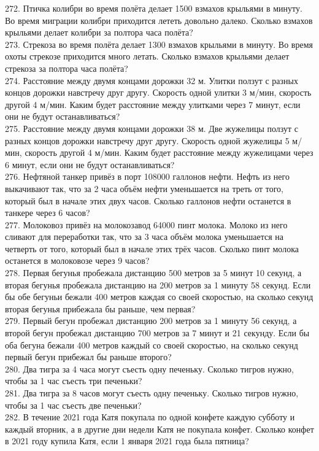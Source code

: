 272. Птичка колибри во время полёта делает 1500 взмахов крыльями в минуту. Во время миграции колибри приходится лететь довольно далеко. Сколько взмахов крыльями делает колибри за полтора часа полёта?\\
273. Стрекоза во время полёта делает 1300 взмахов крыльями в минуту. Во время охоты стрекозе приходится много летать. Сколько взмахов крыльями делает стрекоза за полтора часа полёта?\\
274. Расстояние между двумя концами дорожки 32 м. Улитки ползут с разных концов дорожки навстречу друг другу. Скорость одной улитки 3 м/мин, скорость другой 4 м/мин. Каким будет расстояние между улитками через 7 минут, если они не будут останавливаться?\\
275. Расстояние между двумя концами дорожки 38 м. Две жужелицы ползут с разных концов дорожки навстречу друг другу. Скорость одной жужелицы 5 м/мин, скорость другой 4 м/мин. Каким будет расстояние между жужелицами через 6 минут, если они не будут останавливаться?\\
276. Нефтяной танкер привёз в порт 108000 галлонов нефти. Нефть из него выкачивают так, что за 2 часа объём нефти уменьшается на треть от того, который был в начале этих двух часов. Сколько галлонов нефти останется в танкере через 6 часов?\\
277. Молоковоз привёз на молокозавод 64000 пинт молока. Молоко из него сливают для переработки так, что за 3 часа объём молока уменьшается на четверть от того, который был в начале этих трёх часов. Сколько пинт молока останется в молоковозе через 9 часов?\\
278. Первая бегунья пробежала дистанцию 500 метров за 5 минут 10 секунд, а вторая бегунья пробежала дистанцию на 200 метров за 1 минуту 58 секунд. Если бы обе бегуньи бежали 400 метров каждая со своей скоростью, на сколько секунд вторая бегунья прибежала бы раньше, чем первая?\\
279. Первый бегун пробежал дистанцию 200 метров за 1 минуту 56 секунд, а второй бегун пробежал дистанцию 700 метров за 7 минут и 21 секунду. Если бы оба бегуна бежали 400 метров каждый со своей скоростью, на сколько секунд первый бегун прибежал бы раньше второго?\\
280. Два тигра за 4 часа могут съесть одну печеньку. Сколько тигров нужно, чтобы за 1 час съесть три печеньки?\\
281. Два тигра за 8 часов могут съесть одну печеньку. Сколько тигров нужно, чтобы за 1 час съесть две печеньки?\\
282. В течение 2021 года Катя покупала по одной конфете каждую субботу и каждый вторник, а в другие дни недели Катя не покупала конфет. Сколько конфет в 2021 году купила Катя, если 1 января 2021 года была пятница?\\
